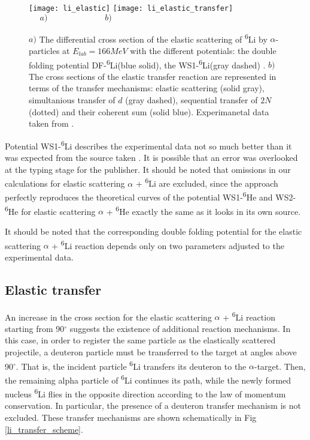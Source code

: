 \documentclass[
12pt, %
oneside, %
english, %
onehalfspacing, %
onehalfspacing, %
headsepline, %
]{MastersDoctoralThesis} %
\newcommand{\he}{\textsuperscript{6}He\xspace}
\newcommand{\li}{\textsuperscript{6}Li\xspace}
\begin{document}
\begin{figure}
\centering
\texttt{[image: li\_elastic]}
\texttt{[image: li\_elastic\_transfer]}\\
$~~~~~~a)~~~~~~~~~~~~~~~~~~~~~~~~~~~~~~~b)$
\decoRule
\caption{  \footnotesize  $a)$ The differential cross section of the elastic scattering of \li by $\alpha$-particles at $E_{lab} = 166 MeV$ with the different potentials: the double folding potential DF-\li (blue solid), the WS1-\li  (gray dashed) \cite{oganessian1999dynamics}. $b)$ The cross sections of the elastic transfer reaction are represented in terms of the transfer mechanisms: elastic scattering (solid gray), simultanious transfer of $d$ (gray dashed), sequential transfer of $2N$ (dotted) and their coherent sum (solid blue). Experimanetal data taken from \cite{oganessian1999dynamics}.
}
\label{li_elastic}
\end{figure}

Potential WS1-\li describes the experimental data not so much better than it was expected from the source taken \cite{oganessian1999dynamics}.
 It is possible that an error was overlooked at the typing stage for the publisher. It should be noted that omissions in our calculations for elastic scattering $\alpha$ + \li are excluded, since the approach perfectly reproduces the theoretical curves of the potential WS1-\he and WS2-\he for elastic scattering $\alpha$ + \he exactly the same as it looks in its own source. 
 
 It should be noted that the corresponding double folding potential  for the elastic scattering $\alpha$ + \li  reaction depends only on two parameters adjusted to the experimental data.



\subsection{Elastic transfer}
An increase in the cross section for the elastic scattering $\alpha$ + \li  reaction starting from 90$^\circ$ suggests the existence of additional reaction mechanisms.
 In this case, in order to register the same particle as the elastically scattered projectile, a deuteron particle must be transferred to the target at angles above 90$^\circ$. 
 That is, the incident particle \li transfers its deuteron to the $\alpha$-target. Then, the remaining alpha particle of \li continues its path, while the newly formed nucleus \li flies in the opposite direction according to the law of momentum conservation. 
 In particular, the presence of a deuteron transfer mechanism is not excluded. 
 These transfer mechanisms are shown schematically in Fig \ref{li_transfer_scheme}.
\end{document}
